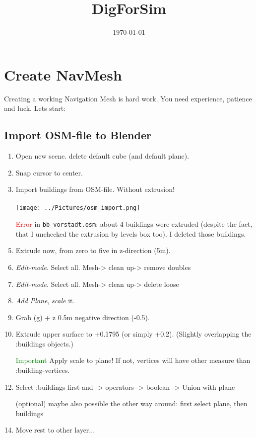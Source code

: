 \documentclass[10pt,a4paper]{article}
\title{DigForSim}
\date{\today}
\begin{document}
\maketitle

\section{Create NavMesh}
Creating a working Navigation Mesh is hard work. You need experience, patience and luck.
Lets start:
\subsection{Import OSM-file to Blender}
\begin{enumerate}
\item Open new scene. delete default cube (and default plane).
\item Snap cursor to center.
\item Import buildings from OSM-file. Without extrusion!\\ \vspace{0.05cm}\\
\texttt{[image: ../Pictures/osm\_import.png]} \\ 
\item[\textcolor{red}{Error}]  in \texttt{bb\_vorstadt.osm}: about 4 buildings were extruded (despite the fact, that I unchecked the extrusion by levels box too). I deleted those buildings.
\item Extrude now, from zero to five in z-direction (5m).
\item \textit{Edit-mode}. Select all. Mesh-> clean up-> remove doubles
\item \textit{Edit-mode}. Select all. Mesh-> clean up-> delete loose
\item \textit{Add Plane}, \textit{scale} it. 
\item Grab (g) + z 0.5m negative direction (-0.5).
\item Extrude upper surface to +0.1795 (or simply +0.2). (Slightly overlapping the :buildings objects.)
\item[\textcolor{green}{Important}] Apply scale to plane! If not, vertices will have other measure than :building-vertices. 
\item Select :buildings first and -> operators -> boolean -> Union with plane
\item[(optional)] maybe also possible the other way around: first select plane, then buildings 
\item Move rest to other layer...
\end{enumerate}
\end{document}
